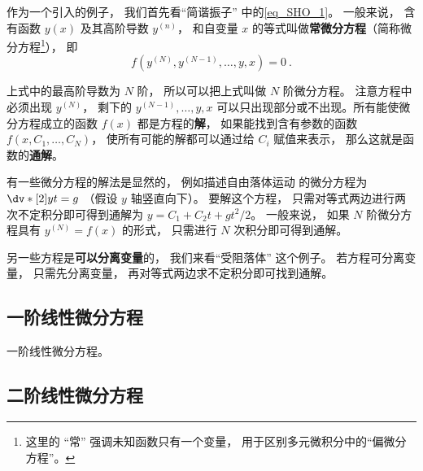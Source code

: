 
\begin{issues}
\issueDraft
\end{issues}


作为一个引入的例子， 我们首先看“简谐振子” 中的\autoref{eq_SHO_1}。 一般来说， 含有函数 $y(x)$ 及其高阶导数 $y^{(n)}$， 和自变量 $x$ 的等式叫做\textbf{常微分方程}（简称微分方程\footnote{这里的 “常” 强调未知函数只有一个变量， 用于区别多元微积分中的“偏微分方程”。}）， 即
\begin{equation}
f(y^{(N)}, y^{(N-1)}, \dots, y, x) = 0~.
\end{equation}

上式中的最高阶导数为 $N$ 阶， 所以可以把上式叫做 $N$ 阶微分方程。 注意方程中必须出现 $y^{(N)}$， 剩下的 $y^{(N-1)}, \dots, y, x$ 可以只出现部分或不出现。所有能使微分方程成立的函数 $f(x)$ 都是方程的\textbf{解}， 如果能找到含有参数的函数 $f(x,C_1, \dots , C_N)$， 使所有可能的解都可以通过给 $C_i$ 赋值来表示， 那么这就是函数的\textbf{通解}。

有一些微分方程的解法是显然的， 例如描述自由落体运动 的微分方程为 $\dv*[2]{y}{t} = g$ （假设 $y$ 轴竖直向下）。 要解这个方程， 只需对等式两边进行两次不定积分即可得到通解为 $y = C_1 + C_2 t + gt^2/2$。 一般来说， 如果 $N$ 阶微分方程具有 $y^{(N)} = f(x)$ 的形式， 只需进行 $N$ 次积分即可得到通解。

另一些方程是\textbf{可以分离变量}的， 我们来看“受阻落体” 这个例子。 若方程可分离变量， 只需先分离变量， 再对等式两边求不定积分即可找到通解。



\subsection{一阶线性微分方程}
一阶线性微分方程。

\subsection{二阶线性微分方程}

